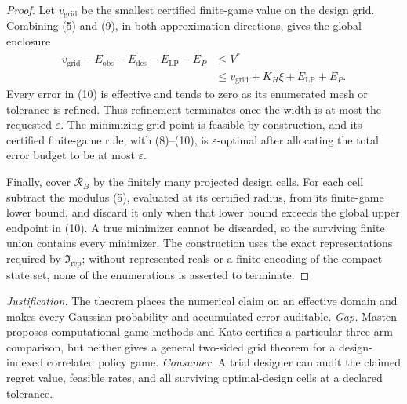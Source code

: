 \documentclass{article}
\begin{document}
\begin{proof}
Let \(v_{\mathrm{grid}}\) be the smallest certified finite-game value on the design grid.  Combining (5) and (9), in both approximation directions, gives the global enclosure
\[
 \begin{split}
 v_{\mathrm{grid}}-E_{\mathrm{obs}}-E_{\mathrm{des}}-E_{\mathrm{LP}}-E_P
 &\leq V^*\\
 &\leq v_{\mathrm{grid}}+K_H\xi+E_{\mathrm{LP}}+E_P.                \tag{10}
 \end{split}
\]
Every error in (10) is effective and tends to zero as its enumerated mesh or tolerance is refined.  Thus refinement terminates once the width is at most the requested \(\varepsilon\).  The minimizing grid point is feasible by construction, and its certified finite-game rule, with (8)--(10), is \(\varepsilon\)-optimal after allocating the total error budget to be at most \(\varepsilon\).

Finally, cover \(\mathcal R_B\) by the finitely many projected design cells.  For each cell subtract the modulus (5), evaluated at its certified radius, from its finite-game lower bound, and discard it only when that lower bound exceeds the global upper endpoint in (10).  A true minimizer cannot be discarded, so the surviving finite union contains every minimizer.  The construction uses the exact representations required by \(\mathfrak I_{\mathrm{rep}}\); without represented reals or a finite encoding of the compact state set, none of the enumerations is asserted to terminate.
\end{proof}
\par\smallskip\noindent \textit{Justification.} The theorem places the numerical claim on an effective domain and makes every Gaussian probability and accumulated error auditable. \textit{Gap.} Masten proposes computational-game methods and Kato certifies a particular three-arm comparison, but neither gives a general two-sided grid theorem for a design-indexed correlated policy game. \textit{Consumer.} A trial designer can audit the claimed regret value, feasible rates, and all surviving optimal-design cells at a declared tolerance.
\end{document}
